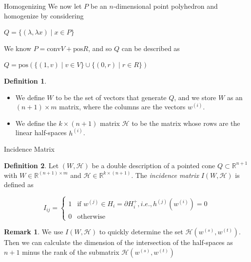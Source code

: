 \documentclass[9pt]{beamer}
\newcommand\R{\mathbb{R}}
\newcommand\set[1]{\{#1\}}
\theoremstyle{definition}
\newtheorem{remark}{Remark}
\newtheorem{defn}{Definition}
\begin{document}


\begin{frame}[fragile]{Homogenizing}
  We now let $P$ be an $n$-dimensional point polyhedron and homogenize by considering
  \begin{center}
    $Q  = \set{(\lambda, \lambda x) \mid x \in P}$
  \end{center}
  We know $P = \text{conv}V + \text{pos}R$, and so $Q$ can be described as
  \begin{center}
    $Q = \text{pos}(\set{(1, v) \mid v \in V} \cup \set{(0, r) \mid r \in R})$
  \end{center}
  \begin{defn}
    \begin{itemize}
      \item We define $W$ to be the set of vectors that generate $Q$, and we store $W$
    as an $(n+1) \times m$ matrix, where the columns are the vectors $w^{(i)}$.\\
    \item We define the $k \times(n+1)$ matrix $\mathcal{H}$ to be the matrix whose
      rows are the linear half-spaces $h^{(i)}$.
    \end{itemize}
  \end{defn}
\end{frame}


\begin{frame}[fragile]{Incidence Matrix}
  \begin{defn}
    Let $(W, \mathcal{H})$ be a double description of a pointed cone $Q \subset \R^{n+1}$
    with $W \in \R^{(n+1) \times m}$ and $\mathcal{H} \in \R^{k \times (n+1)}$. The \emph{incidence matrix} $I(W, \mathcal{H})$ is defined as
    
    \begin{equation}
      I_{ij}=
      \begin{cases}
        1 & \text{if } w^{(j)} \in H_i = \partial H_i^+, i.e., h^{(j)} (w^{(i)}) = 0\\
        0 &  \text{otherwise}
      \end{cases}
    \end{equation}
  \end{defn}
  \begin{remark}
    We use $I(W, \mathcal{H})$ to quickly determine the set $\mathcal{H}(w^{(s)}, w^{(t)})$. Then we can calculate the dimension of the intersection of the half-spaces as $n+1$ minus the rank of the submatrix $\mathcal{H}(w^{(s)}, w^{(t)})$
  \end{remark}
\end{frame}
\end{document}
